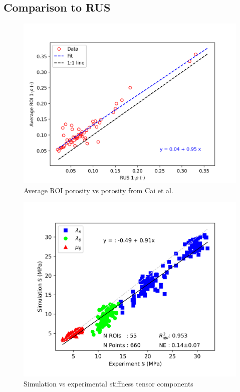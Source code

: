 \documentclass[a4paper,fleqn]{DC_ArtStyle}
\begin{document}
	\clearpage
	\subsection{Comparison to RUS}

	\begin{figure}[!h]
		\centering
			\includegraphics[height=\linewidth]{../_Results/ExpSim_Rho}
			\caption{Average ROI porosity vs porosity from Cai et al.}
	\end{figure}

	\begin{figure}[!h]
		\centering
			\includegraphics[height=\linewidth]{../_Results/ExpSim_S}
			\caption{Simulation vs experimental stiffness tensor components}
	\end{figure}
\end{document}
